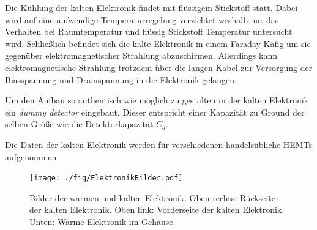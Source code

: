 Die Kühlung der kalten Elektronik findet mit flüssigem Stickstoff statt.
Dabei wird auf eine aufwendige Temperaturregelung verzichtet weshalb nur das Verhalten bei Raumtemperatur und flüssig Stickstoff Temperatur untersucht wird.
Schließlich befindet sich die kalte Elektronik in einem Faraday-Käfig um sie gegenüber elektromagnetischer Strahlung abzuschirmen.
Allerdings kann elektromagnetische Strahlung trotzdem über die langen Kabel zur Versorgung der Biasspannung und Drainspannung in die Elektronik gelangen.

Um den Aufbau so authentisch wie möglich zu gestalten in der kalten Elektronik ein \textit{dummy detector} eingebaut.
Dieser entspricht einer Kapazität zu Ground der selben Größe wie die Detektorkapazität $C_d$.

Die Daten der kalten Elektronik werden für verschiedenen handelsübliche HEMTs aufgenommen.

\begin{figure}[!t]
\begin{center}
\texttt{[image: ./fig/ElektronikBilder.pdf]}
\vspace{-0.5cm}
\caption{Bilder der warmen und kalten Elektronik.
Oben rechts: Rückseite der kalten Elektronik. Oben link: Vorderseite der kalten Elektronik.
Unten: Warme Elektronik im Gehäuse.}
\label{fig:ElektronikBilder}
\end{center}
\end{figure}
